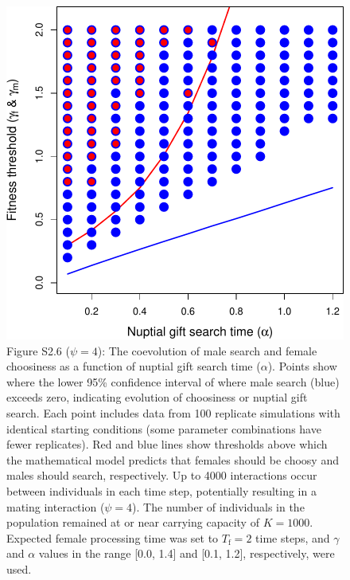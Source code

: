 \documentclass[
]{article}
\begin{document}
\clearpage

\captionsetup{labelformat=empty}

\begin{figure}
\centering
\includegraphics{SI_files/figure-latex/unnamed-chunk-7-1.pdf}
\caption{Figure S2.6 (\(\psi = 4\)): The coevolution of male search and
female choosiness as a function of nuptial gift search time
(\(\alpha\)). Points show where the lower 95\% confidence interval of
where male search (blue) exceeds zero, indicating evolution of
choosiness or nuptial gift search. Each point includes data from 100
replicate simulations with identical starting conditions (some parameter
combinations have fewer replicates). Red and blue lines show thresholds
above which the mathematical model predicts that females should be
choosy and males should search, respectively. Up to 4000 interactions
occur between individuals in each time step, potentially resulting in a
mating interaction (\(\psi = 4\)). The number of individuals in the
population remained at or near carrying capacity of \(K = 1000\).
Expected female processing time was set to \(T_{\mathrm{f}}=2\) time
steps, and \(\gamma\) and \(\alpha\) values in the range {[}0.0, 1.4{]}
and {[}0.1, 1.2{]}, respectively, were used.}
\end{figure}

\captionsetup{labelformat=default}
\end{document}
